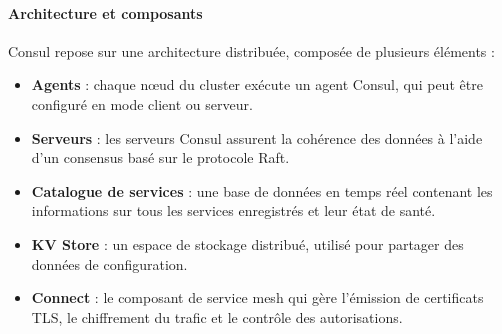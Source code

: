 


\paragraph{Architecture et composants}

Consul repose sur une architecture distribuée, composée de plusieurs éléments :
\begin{itemize}
	\item \textbf{Agents} : chaque nœud du cluster exécute un agent Consul, qui peut être configuré en mode client ou serveur.
	\item \textbf{Serveurs} : les serveurs Consul assurent la cohérence des données à l’aide d’un consensus basé sur le protocole Raft.
	\item \textbf{Catalogue de services} : une base de données en temps réel contenant les informations sur tous les services enregistrés et leur état de santé.
	\item \textbf{KV Store} : un espace de stockage distribué, utilisé pour partager des données de configuration.
	\item \textbf{Connect} : le composant de service mesh qui gère l’émission de certificats TLS, le chiffrement du trafic et le contrôle des autorisations.
\end{itemize}


